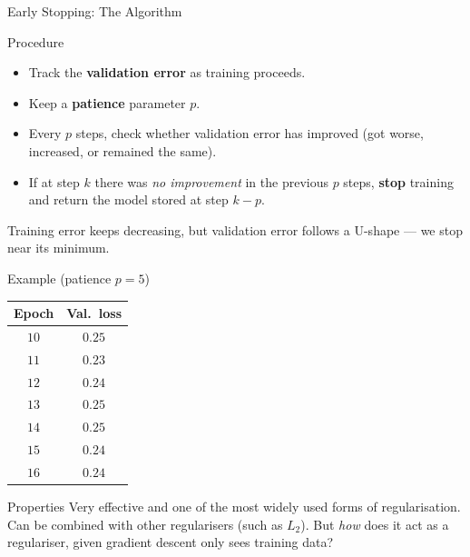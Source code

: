 \documentclass{beamer}
\begin{document}
\begin{frame}[shrink=10]{Early Stopping: The Algorithm}
  \begin{block}{Procedure}
    \begin{itemize}\setlength\itemsep{3pt}
      \item Track the \textbf{validation error} as training proceeds.
      \item Keep a \textbf{patience} parameter $p$.
      \item Every $p$ steps, check whether validation error has improved
            (got worse, increased, or remained the same).
      \item If at step $k$ there was \emph{no improvement} in the previous
            $p$ steps, \textbf{stop} training and return the model stored at
            step $k-p$.
    \end{itemize}
    Training error keeps decreasing, but validation error follows a U-shape
    --- we stop near its minimum.
  \end{block}

  \begin{exampleblock}{Example (patience $p=5$)}
    \centering
    \begin{tabular}{cc}
      \toprule
      \textbf{Epoch} & \textbf{Val.\ loss}\\
      \midrule
      $10$ & $0.25$\\
      $11$ & $0.23$\\
      $12$ & $0.24$\\
      $13$ & $0.25$\\
      $14$ & $0.25$\\
      $15$ & $0.24$\\
      $16$ & $0.24$\\
      \bottomrule
    \end{tabular}
  \end{exampleblock}

  \begin{block}{Properties}
    Very effective and one of the most widely used forms of regularisation.
    Can be combined with other regularisers (such as $L_2$). But \emph{how}
    does it act as a regulariser, given gradient descent only sees training
    data?
  \end{block}
\end{frame}
\end{document}
